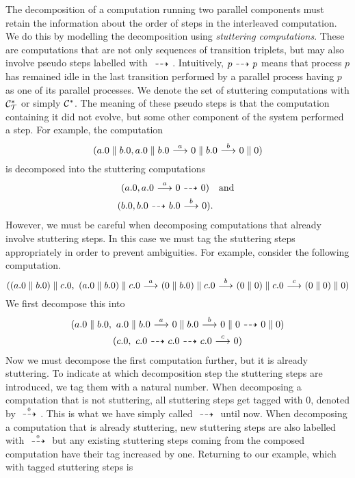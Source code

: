 The decomposition of a computation running two parallel components must retain the
information about the order of steps in the interleaved computation. We do this
by modelling the decomposition using {\em stuttering computations}. These are
computations that are not only sequences of transition triplets, but may also involve
pseudo steps labelled with $\ {\stackrel{_{}}{\dashrightarrow}}\ $. Intuitively, $p\ {\stackrel{_{}}{\dashrightarrow}}\  p$ means that
process $p$ has remained idle in the last transition performed by a parallel process
having $p$ as one of its parallel processes.
We denote
the set of stuttering computations with $\mathcal{C}_{\mathcal{T}}^*$ or simply $\mathcal{C}^*$.
The meaning of these pseudo steps is that
the computation containing it did not evolve, but some other component of the
system performed a step. For example, the computation
\[
(a.0\parallel b.0,
a.0\parallel b.0 \ {\stackrel{{a}}{\longrightarrow}}\ 
0\parallel b.0 \ {\stackrel{{b}}{\longrightarrow}}\ 
0\parallel 0)
\]
is decomposed into the stuttering computations
\begin{gather*}
    (a.0,a.0 \trans{a}0 \ptrans{}0) \quad\textrm{and}\\
    (b.0,b.0 \ptrans{} b.0 \trans{b} 0).\quad\phantom{\textrm{and}}
\end{gather*}
%
However, we must be careful when decomposing computations that
already involve stuttering steps.
In this case we must tag the stuttering steps appropriately in order to prevent ambiguities.
For example, consider the following computation.
\[
((a.0\parallel b.0) \parallel c.0,\
 (a.0\parallel b.0) \parallel c.0 \ {\stackrel{{a}}{\longrightarrow}}\ 
 (0 \parallel b.0) \parallel c.0 \ {\stackrel{{b}}{\longrightarrow}}\ 
 (0 \parallel 0) \parallel c.0 \ {\stackrel{{c}}{\longrightarrow}}\ 
 (0 \parallel 0) \parallel 0)
\]
We first decompose this into
\begin{gather*}
(a.0\parallel b.0,\
a.0\parallel b.0 \ {\stackrel{{a}}{\longrightarrow}}\ 
0\parallel b.0 \ {\stackrel{{b}}{\longrightarrow}}\ 
0\parallel 0 \ {\stackrel{_{}}{\dashrightarrow}}\ 
0\parallel 0)
\\
(c.0,\ c.0 \ {\stackrel{_{}}{\dashrightarrow}}\  c.0 \ {\stackrel{_{}}{\dashrightarrow}}\  c.0 \ {\stackrel{{c}}{\longrightarrow}}\  0)
\end{gather*}
Now we must decompose the first computation further, but it is already stuttering.
To indicate at which decomposition step the stuttering steps are introduced,
we tag them with a natural number. When decomposing a computation that is not
stuttering, all stuttering steps get tagged with $0$, denoted by $\ {\stackrel{_{0}}{\dashrightarrow}}\ $. This is what
we have simply called $\ {\stackrel{_{}}{\dashrightarrow}}\ $ until now. When decomposing a computation that
is already stuttering, new stuttering steps are also labelled with 
$\ {\stackrel{_{0}}{\dashrightarrow}}\ $ but any existing
stuttering steps coming from the composed computation
have their tag increased by one.
Returning to our example, which with tagged stuttering steps is
